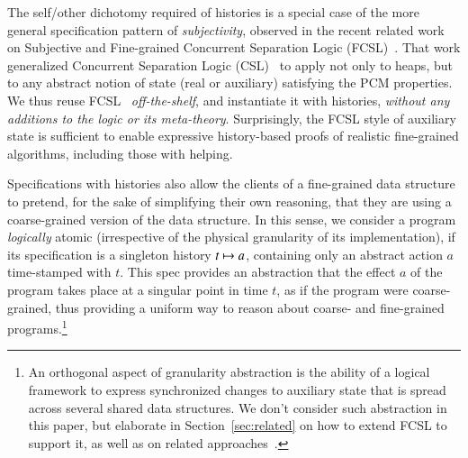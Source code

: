 The self/other dichotomy required of histories is a special case of
the more general specification pattern of \emph{subjectivity},
observed in the recent related work on Subjective and Fine-grained
Concurrent Separation Logic
(FCSL)~\cite{LeyWild-Nanevski:POPL13,Nanevski-al:ESOP14}. That work
generalized Concurrent Separation Logic (CSL)~\cite{OHearn:TCS07}
to apply not only to heaps, but to any abstract notion of state (real
or auxiliary) satisfying the PCM properties.
%
We thus reuse FCSL~\cite{Nanevski-al:ESOP14} \emph{off-the-shelf}, and
instantiate it with histories, \emph{without any additions to the
  logic or its meta-theory}. Surprisingly, the FCSL style of auxiliary
state is sufficient to enable expressive history-based proofs of
realistic fine-grained algorithms, including those with helping.


Specifications with histories also allow the clients of a fine-grained
data structure to pretend, for the sake of simplifying their own
reasoning, that they are using a coarse-grained version of the data
structure.
%
%
In this sense, we consider a program \emph{logically} atomic
(irrespective of the physical granularity of its implementation), if
its specification is a singleton history $t \mapsto a$, containing only
an abstract action $a$ time-stamped with $t$. This spec provides an
abstraction that the effect $a$ of the program takes place at a
singular point in time $t$, as if the program were coarse-grained,
thus providing a uniform way to reason about coarse- and fine-grained
programs.\footnote{An orthogonal aspect of granularity abstraction is
  the ability of a logical framework to express synchronized changes
  to auxiliary state that is spread across several shared data
  structures. We don't consider such abstraction in this paper, but
  elaborate in Section~\ref{sec:related} on how to extend FCSL to
  support it, as well as on related
  approaches~\cite{Svendsen-Birkedal:ESOP14,Svendsen-al:ESOP13,ArrozPincho-al:ECOOP14,Jacobs-Piessens:POPL11}.}
%
%

